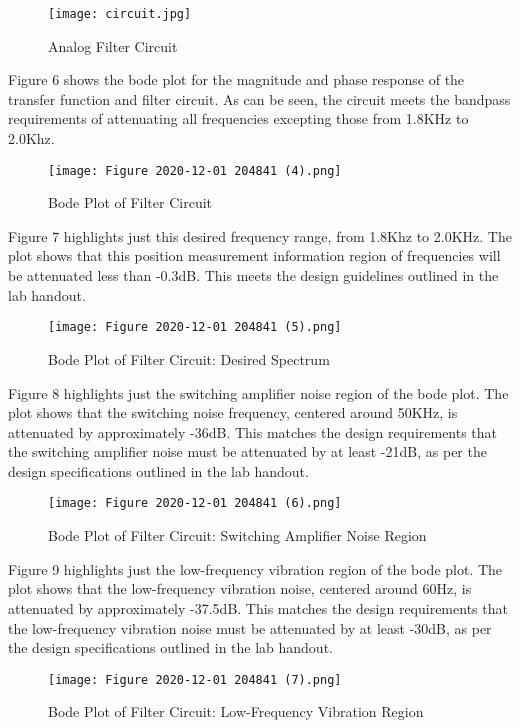 \documentclass[12pt, titlepage]{article}
\begin{document}
        \begin{figure}[h!]
            \centering
            \texttt{[image: circuit.jpg]}
            \caption{Analog Filter Circuit}
            \label{fig:my_label}
        \end{figure}
    \clearpage
    Figure 6 shows the bode plot for the magnitude and phase response of the transfer function and filter circuit.  As can be seen, the circuit meets the bandpass requirements of attenuating all frequencies excepting those from 1.8KHz to 2.0Khz.
        \begin{figure}[h!]
            \centering
            \texttt{[image: Figure 2020-12-01 204841 (4).png]}
            \caption{Bode Plot of Filter Circuit}
            \label{fig:my_label}
        \end{figure}
    \clearpage
    Figure 7 highlights just this desired frequency range, from 1.8Khz to 2.0KHz.  The plot shows that this position measurement information region of frequencies will be attenuated less than -0.3dB.  This meets the design guidelines outlined in the lab handout.
        \begin{figure}[h!]
            \centering
            \texttt{[image: Figure 2020-12-01 204841 (5).png]}
            \caption{Bode Plot of Filter Circuit: Desired Spectrum}
            \label{fig:my_label}
        \end{figure}
    \clearpage
    Figure 8 highlights just the switching amplifier noise region of the bode plot.  The plot shows that the switching noise frequency, centered around 50KHz, is attenuated by approximately -36dB.  This matches the design requirements that the switching amplifier noise must be attenuated by at least -21dB, as per the design specifications outlined in the lab handout.    
        \begin{figure}[h!]
            \centering
            \texttt{[image: Figure 2020-12-01 204841 (6).png]}
            \caption{Bode Plot of Filter Circuit: Switching Amplifier Noise Region}
            \label{fig:my_label}
        \end{figure}
     \clearpage
     Figure 9 highlights just the low-frequency vibration region of the bode plot.  The plot shows that the low-frequency vibration noise, centered around 60Hz, is attenuated by approximately -37.5dB.  This matches the design requirements that the low-frequency vibration noise must be attenuated by at least -30dB, as per the design specifications outlined in the lab handout.
        \begin{figure}[h!]
            \centering
            \texttt{[image: Figure 2020-12-01 204841 (7).png]}
            \caption{Bode Plot of Filter Circuit: Low-Frequency Vibration Region}
            \label{fig:my_label}
        \end{figure}
\end{document}
